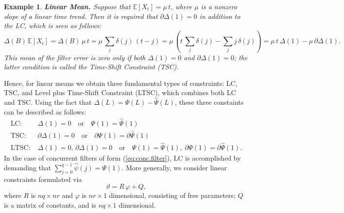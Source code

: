 \documentclass[a4paper]{book}
\def\EE{\mathbb E}
\newtheorem{Example}{Example}
\begin{document}
\begin{Example}    {\bf Linear Mean.}  \rm
\label{exam:linear.mean}
  Suppose that $\EE [ X_t ] = \mu \, t$, where $\mu$ is a nonzero slope
 of a linear time trend.  Then it is required that  $\partial {\Delta} (1) = 0$
  in addition to the LC,  which is seen as follows:
  \[
   \Delta (B) \, \EE [ X_t] = \Delta(B) \, \mu \, t =   \mu \, \sum_j \delta (j) \, (t-j)
   = \mu \, \left(t \, \sum_j \delta (j) - \sum_j j \,\delta (j) \right)
    = \mu \, t \, \Delta(1) - \mu \, \partial \Delta (1).
  \]
  This mean of the filter error  is zero only if both $\Delta(1)=0$ and
  $\partial \Delta (1)=0$; the latter condition is called the
   Time-Shift Constraint (TSC).  
\end{Example}  

     Hence, for linear means we obtain
 three fundamental types of constraints: LC, TSC, and Level plus 
 Time-Shift Constraint (LTSC), which combines both LC and TSC.
  Using the fact that $\Delta (L) = \Psi (L) - \widehat{\Psi} (L)$,
   these three constaints can be described as follows:
\begin{align*}
 \mbox{LC} : &  \;  \Delta (1) = 0 \quad \mbox{or} \quad \Psi (1) = \widehat{\Psi} (1) \\
 \mbox{TSC} : &  \;   \partial {\Delta} (1) = 0 \quad \mbox{or} \quad 
 \partial {\Psi} (1) = \partial {\widehat{\Psi}} (1)  \\
 \mbox{LTSC} : &  \;  \Delta (1) = 0,  \,  \partial {\Delta} (1) = 0 \quad 
 \mbox{or} \quad \Psi (1) = \widehat{\Psi} (1), \; \partial {\Psi} (1) =
 \partial {\widehat{\Psi}} (1).
\end{align*}
 In the case of  concurrent filters of form  (\ref{eq:conc.filter}), 
 LC is accomplished by demanding that 
  $\sum_{j=0}^{q-1} \widehat{\psi} (j) = \Psi(1)$.   More generally, we consider  linear constraints  formulated via
\begin{equation}
\label{eq:concurrent-constrain}
  \vartheta = R \, \varphi + Q,
\end{equation}
 where $R$ is $n q \times n r$ and $\varphi$ is $n r \times 1$ dimensional, consisting of 
 free parameters; $Q$ is a matrix of constants, and is $n q \times 1$ dimensional.
\end{document}

